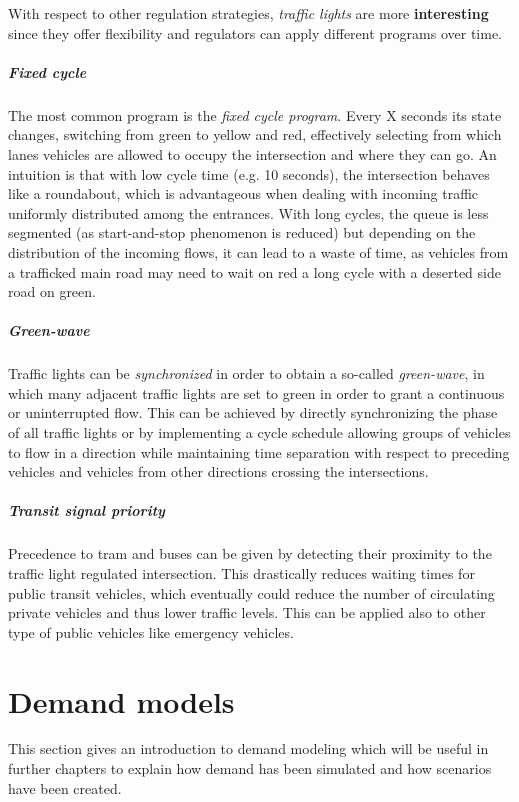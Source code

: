 With respect to other regulation strategies, \textit{traffic lights} are more \textbf{interesting} since they offer flexibility and regulators can apply different programs over time.

\subparagraph{Fixed cycle}

The most common program is the \textit{fixed cycle program}. Every X seconds its state changes, switching from green to yellow and red, effectively selecting from which lanes vehicles are allowed to occupy the intersection and where they can go. An intuition is that with low cycle time (e.g. 10 seconds), the intersection behaves like a roundabout, which is advantageous when dealing with incoming traffic uniformly distributed among the entrances. With long cycles, the queue is less segmented (as start-and-stop phenomenon is reduced) but depending on the distribution of the incoming flows, it can lead to a waste of time, as vehicles from a trafficked main road may need to wait on red a long cycle with a deserted side road on green.

\subparagraph{Green-wave}

Traffic lights can be \textit{synchronized} in order to obtain a so-called \textit{green-wave}, in which many adjacent traffic lights are set to green in order to grant a continuous or uninterrupted flow. This can be achieved by directly synchronizing the phase of all traffic lights or by implementing a cycle schedule allowing groups of vehicles to flow in a direction while maintaining time separation with respect to preceding vehicles and vehicles from other directions crossing the intersections.

\subparagraph{Transit signal priority}

Precedence to tram and buses can be given by detecting their proximity to the traffic light regulated intersection. This drastically reduces waiting times for public transit vehicles, which eventually could reduce the number of circulating private vehicles and thus lower traffic levels. This can be applied also to other type of public vehicles like emergency vehicles.

\section{Demand models}

This section gives an introduction to demand modeling which will be useful in further chapters to explain how demand has been simulated and how scenarios have been created.

